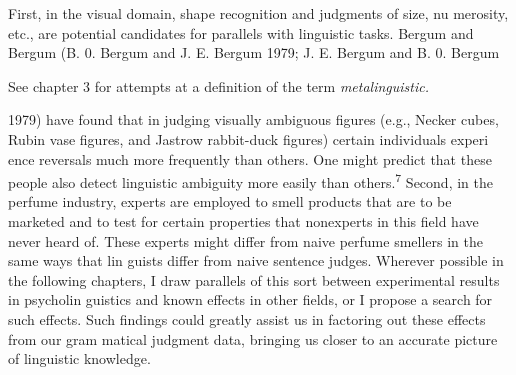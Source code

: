 \begin{styleStandard}
First, in the visual domain, shape recognition and judgments of size, nu\- merosity, etc., are potential candidates for parallels with linguistic tasks. Bergum and Bergum (B. 0. Bergum and J. E. Bergum 1979; J. E. Bergum and B. 0. Bergum
\end{styleStandard}


\setcounter{listWWNumlxixleveli}{1}
\begin{listWWNumlxixleveli}
\item 
\begin{styleStandard}
See chapter 3 for attempts at a definition of the term \textit{metalinguistic.}
\end{styleStandard}


\end{listWWNumlxixleveli}
\clearpage\setcounter{page}{1}\begin{styleTextbody}
1979) have found that in judging visually ambiguous figures (e.g., Necker cubes, Rubin vase figures, and Jastrow rabbit-duck figures) certain individuals experi\- ence reversals much more frequently than others. One might predict that these people also detect linguistic ambiguity more easily than others.\textsuperscript{7}\textsuperscript{ }Second, in the perfume industry, experts are employed to smell products that are to be marketed and to test for certain properties that nonexperts in this field have never heard of. These experts might differ from naive perfume smellers in the same ways that lin\- guists differ from naive sentence judges. Wherever possible in the following chapters, I draw parallels of this sort between experimental results in psycholin\- guistics and known effects in other fields, or I propose a search for such effects. Such findings could greatly assist us in factoring out these effects from our gram\- matical judgment data, bringing us closer to an accurate picture of linguistic knowledge.
\end{styleTextbody}


